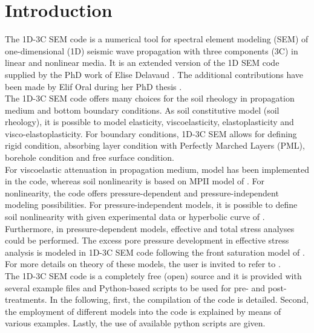 \chapter{Introduction}


The 1D-3C SEM code is a numerical tool for spectral element modeling (SEM) of one-dimensional (1D) seismic wave propagation with three components (3C) in linear and nonlinear media. It is an extended version of the 1D SEM code supplied by the PhD work of Elise Delavaud \cite{Delavaud2007}. The additional contributions have been made by Elif Oral during her PhD thesis \cite{Oral2016}. \\

The 1D-3C SEM code offers many choices for the soil rheology in propagation medium and bottom boundary conditions. As soil constitutive model (soil rheology), it is possible to model elasticity, viscoelasticity, elastoplasticity and visco-elastoplasticity. For boundary conditions, 1D-3C SEM allows for defining rigid condition, absorbing layer condition with Perfectly Marched Layers (PML), borehole condition and free surface condition. \\

For viscoelastic attenuation in propagation medium, \cite{LiuArchuleta2006} model has been implemented in the code, whereas soil nonlinearity is based on MPII model of \cite{Iwan1967}. For nonlinearity, the code offers pressure-dependent and pressure-independent modeling possibilities. For pressure-independent models, it is possible to define soil nonlinearity with given experimental data or hyperbolic curve of  \cite{HardinDrnevich1972}. Furthermore, in pressure-dependent models, effective and total stress analyses could be performed. The excess pore pressure development in effective stress analysis is modeled in 1D-3C SEM code following the front saturation model of \cite{Iaietal1990}. For more details on theory of these models, the user is invited to refer to \cite{Oral2016}. \\


The 1D-3C SEM code is a completely free (open) source and it is provided with several example files and Python-based scripts to be used for pre- and post-treatments.  In the following, first, the compilation of the code is detailed. Second, the employment of different models into the code is explained by means of various examples. Lastly, the use of available python scripts are given. \\
